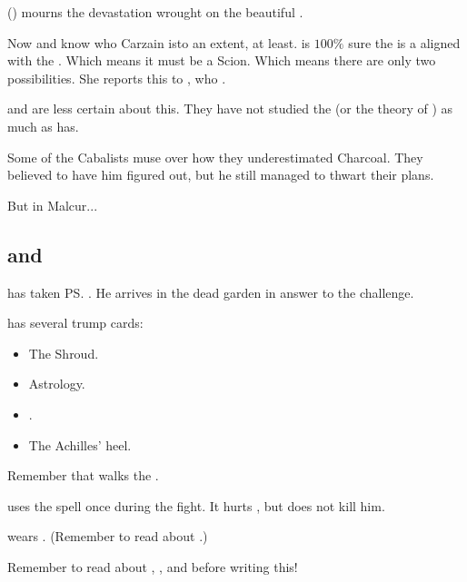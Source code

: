 \begin{garbage}
\Nzessuacrith{} () mourns the devastation wrought on the beautiful \Forklin. 

Now \Achsah{} and \Nzessuacrith{} know who Carzain is\dash to an extent, at least.
\Achsah{} is $100\%$ sure the \vertex{} is a \sathariah{} aligned with the . 
Which means it must be a Scion. 
Which means there are only two possibilities. 
She reports this to \Azraid, who . 

\Nzessuacrith{} and \Ishnaruchaefir{} are less certain about this. 
They have not studied the \vertex{} (or the theory of \malachim) as much as \Achsah{} has. 

Some of the Cabalists muse over how they underestimated Charcoal. They believed to have him figured out, but he still managed to thwart their plans. 

But in Malcur...









\subsection{\Teshrial{} and \Ishnaruchaefir}
\Ishnaruchaefir{} has taken \ps{\Teshrial} . 
He arrives in the dead garden in answer to the challenge. 

\Teshrial{} has several trump cards:
\begin{itemize}
  \item The Shroud.
  \item Astrology. 
  \item \Ghobaleth.
  \item The Achilles' heel. 
\end{itemize}
    
Remember that \Teshrial{} walks the . 

\Ishnaruchaefir{} uses the spell  once during the fight. 
It hurts \Teshrial, but does not kill him. 

\Ishnaruchaefir{} wears . 
(Remember to read about .)

Remember to read about \hs{\dragons}, \hs{\resphain}, \hs{\Teshrial} and  before writing this!






\end{garbage}

